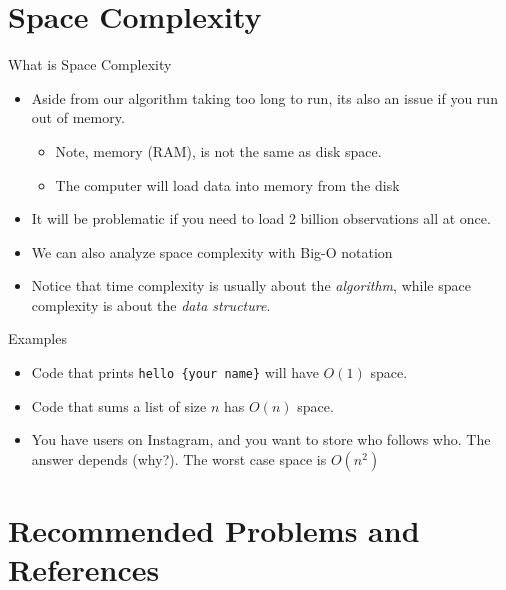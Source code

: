 \documentclass[
  ignorenonframetext,
]{beamer}
\begin{document}
\hypertarget{space-complexity}{%
\section{Space Complexity}\label{space-complexity}}

\begin{frame}{What is Space Complexity}
\protect\hypertarget{what-is-space-complexity}{}
\begin{itemize}
\item
  Aside from our algorithm taking too long to run, its also an issue if
  you run out of memory.

  \begin{itemize}
  \item
    Note, memory (RAM), is not the same as disk space.
  \item
    The computer will load data into memory from the disk
  \end{itemize}
\item
  It will be problematic if you need to load 2 billion observations all
  at once.
\item
  We can also analyze space complexity with Big-O notation
\item
  Notice that time complexity is usually about the \emph{algorithm},
  while space complexity is about the \emph{data structure}.
\end{itemize}
\end{frame}

\begin{frame}[fragile]{Examples}
\protect\hypertarget{examples}{}
\begin{itemize}
\item
  Code that prints \texttt{hello\ \{your\ name\}} will have \(O(1)\)
  space.
\item
  Code that sums a list of size \(n\) has \(O(n)\) space.
\item
  You have users on Instagram, and you want to store who follows who.
  The answer depends (why?). The worst case space is \(O(n^2)\)
\end{itemize}
\end{frame}

\hypertarget{recommended-problems-and-references}{%
\section{Recommended Problems and
References}\label{recommended-problems-and-references}}
\end{document}
